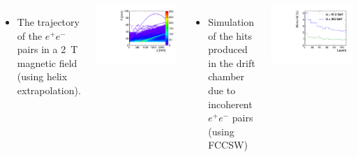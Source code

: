 \documentclass[final,xcolor={dvipsnames,svgnames,x11names,table}]{beamer}
\begin{document}
\begin{frame}
\begin{textblock}{43}
\begin{tcolorbox}[title=Beam-induced backgrounds and the impact on the drift chamber]
  \begin{columns}
      \begin{itemize}
        \item The trajectory of the $e^+e^-$ pairs in a 2~T magnetic field (using helix extrapolation).
      \end{itemize}
      \centering
      \includegraphics[width=\textwidth]{../figures/pairs_R_Z}


    \begin{itemize}
      \item Simulation of the hits produced in the drift chamber due to incoherent $e^+e^-$ pairs (using FCCSW)
    \end{itemize}
    \centering
    \includegraphics[width=\textwidth]{Figures/incoherent_top_Z.pdf}





\end{columns}
\end{tcolorbox}
\end{textblock}
\end{frame}
\end{document}
